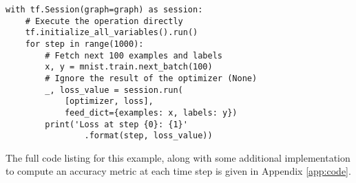 \begin{lstlisting}
with tf.Session(graph=graph) as session:
    # Execute the operation directly
    tf.initialize_all_variables().run()
    for step in range(1000):
        # Fetch next 100 examples and labels
        x, y = mnist.train.next_batch(100)
        # Ignore the result of the optimizer (None)
        _, loss_value = session.run(
            [optimizer, loss],
            feed_dict={examples: x, labels: y})
        print('Loss at step {0}: {1}'
                .format(step, loss_value))
\end{lstlisting}

The full code listing for this example, along with some additional
implementation to compute an accuracy metric at each time step is given in
Appendix \ref{app:code}.

